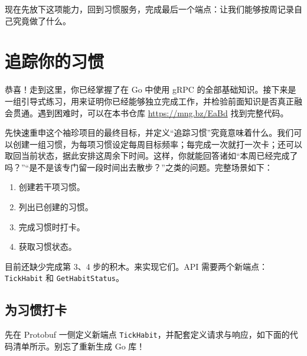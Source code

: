 现在先放下这项能力，回到习惯服务，完成最后一个端点：让我们能够按周记录自己究竟做了什么。

\section{追踪你的习惯}

恭喜！走到这里，你已经掌握了在 Go 中使用 gRPC 的全部基础知识。接下来是一组引导式练习，用来证明你已经能够独立完成工作，并检验前面知识是否真正融会贯通。遇到困难时，可以在本书仓库 \url{https://mng.bz/EaBd} 找到完整代码。

先快速重申这个袖珍项目的最终目标，并定义“追踪习惯”究竟意味着什么。我们可以创建一组习惯，为每项习惯设定每周目标频率；每完成一次就打一次卡；还可以取回当前状态，据此安排这周余下时间。这样，你就能回答诸如“本周已经完成了吗？”“是不是该专门留一段时间出去散步？”之类的问题。完整场景如下：

\begin{enumerate}
  \item 创建若干项习惯。
  \item 列出已创建的习惯。
  \item 完成习惯时打卡。
  \item 获取习惯状态。
\end{enumerate}

目前还缺少完成第 3、4 步的积木。来实现它们。API 需要两个新端点：\texttt{TickHabit} 和 \texttt{GetHabitStatus}。

\subsection{为习惯打卡}

先在 Protobuf 一侧定义新端点 \texttt{TickHabit}，并配套定义请求与响应，如下面的代码清单所示。别忘了重新生成 Go 库！


